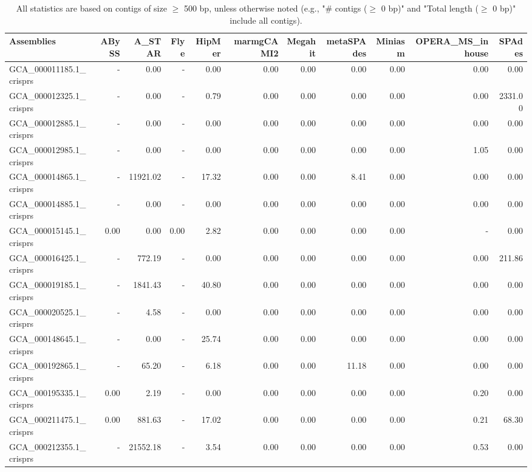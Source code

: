 \documentclass[12pt,a4paper]{article}
\begin{document}
\begin{table}[ht]
\begin{center}
\caption{All statistics are based on contigs of size $\geq$ 500 bp, unless otherwise noted (e.g., "\# contigs ($\geq$ 0 bp)" and "Total length ($\geq$ 0 bp)" include all contigs).}
\begin{tabular}{|l*{10}{|r}|}
\hline
Assemblies & ABySS & A\_STAR & Flye & HipMer & marmgCAMI2 & Megahit & metaSPAdes & Miniasm & OPERA\_MS\_inhouse & SPAdes \\ \hline
GCA\_000011185.1\_crisprs & - & 0.00 & - & 0.00 & 0.00 & 0.00 & 0.00 & 0.00 & 0.00 & 0.00 \\ \hline
GCA\_000012325.1\_crisprs & - & 0.00 & - & 0.79 & 0.00 & 0.00 & 0.00 & 0.00 & 0.00 & 2331.00 \\ \hline
GCA\_000012885.1\_crisprs & - & 0.00 & - & 0.00 & 0.00 & 0.00 & 0.00 & 0.00 & 0.00 & 0.00 \\ \hline
GCA\_000012985.1\_crisprs & - & 0.00 & - & 0.00 & 0.00 & 0.00 & 0.00 & 0.00 & 1.05 & 0.00 \\ \hline
GCA\_000014865.1\_crisprs & - & 11921.02 & - & 17.32 & 0.00 & 0.00 & 8.41 & 0.00 & 0.00 & 0.00 \\ \hline
GCA\_000014885.1\_crisprs & - & 0.00 & - & 0.00 & 0.00 & 0.00 & 0.00 & 0.00 & 0.00 & 0.00 \\ \hline
GCA\_000015145.1\_crisprs & 0.00 & 0.00 & 0.00 & 2.82 & 0.00 & 0.00 & 0.00 & 0.00 & - & 0.00 \\ \hline
GCA\_000016425.1\_crisprs & - & 772.19 & - & 0.00 & 0.00 & 0.00 & 0.00 & 0.00 & 0.00 & 211.86 \\ \hline
GCA\_000019185.1\_crisprs & - & 1841.43 & - & 40.80 & 0.00 & 0.00 & 0.00 & 0.00 & 0.00 & 0.00 \\ \hline
GCA\_000020525.1\_crisprs & - & 4.58 & - & 0.00 & 0.00 & 0.00 & 0.00 & 0.00 & 0.00 & 0.00 \\ \hline
GCA\_000148645.1\_crisprs & - & 0.00 & - & 25.74 & 0.00 & 0.00 & 0.00 & 0.00 & 0.00 & 0.00 \\ \hline
GCA\_000192865.1\_crisprs & - & 65.20 & - & 6.18 & 0.00 & 0.00 & 11.18 & 0.00 & 0.00 & 0.00 \\ \hline
GCA\_000195335.1\_crisprs & 0.00 & 2.19 & - & 0.00 & 0.00 & 0.00 & 0.00 & 0.00 & 0.20 & 0.00 \\ \hline
GCA\_000211475.1\_crisprs & 0.00 & 881.63 & - & 17.02 & 0.00 & 0.00 & 0.00 & 0.00 & 0.21 & 68.30 \\ \hline
GCA\_000212355.1\_crisprs & - & 21552.18 & - & 3.54 & 0.00 & 0.00 & 0.00 & 0.00 & 0.53 & 0.00 \\ \hline

\end{tabular}
\end{center}
\end{table}
\end{document}
